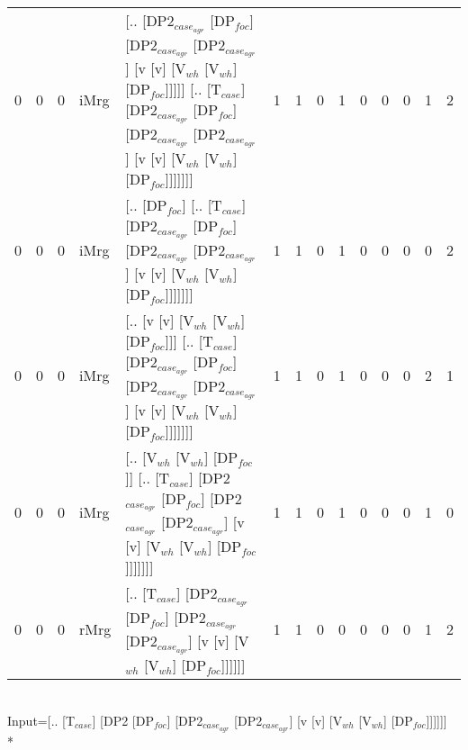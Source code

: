 \begin{tabularx}{\linewidth}{rrrlXrrrrrrrrr}
   0 &       0 &   0 & iMrg & [.. [DP2$_{case_{agr}}$ [DP$_{foc}$] [DP2$_{case_{agr}}$ [DP2$_{case_{agr}}$] [v [v] [V$_{wh}$ [V$_{wh}$] [DP$_{foc}$]]]]] [.. [T$_{case}$] [DP2$_{case_{agr}}$ [DP$_{foc}$] [DP2$_{case_{agr}}$ [DP2$_{case_{agr}}$] [v [v] [V$_{wh}$ [V$_{wh}$] [DP$_{foc}$]]]]]]] &             1 &             1 &                  0 &            1 &              0 &             0 &              0 &          1 &        2 \\
   0 &       0 &   0 & iMrg & [.. [DP$_{foc}$] [.. [T$_{case}$] [DP2$_{case_{agr}}$ [DP$_{foc}$] [DP2$_{case_{agr}}$ [DP2$_{case_{agr}}$] [v [v] [V$_{wh}$ [V$_{wh}$] [DP$_{foc}$]]]]]]]                                                                             &             1 &             1 &                  0 &            1 &              0 &             0 &              0 &          0 &        2 \\
   0 &       0 &   0 & iMrg & [.. [v [v] [V$_{wh}$ [V$_{wh}$] [DP$_{foc}$]]] [.. [T$_{case}$] [DP2$_{case_{agr}}$ [DP$_{foc}$] [DP2$_{case_{agr}}$ [DP2$_{case_{agr}}$] [v [v] [V$_{wh}$ [V$_{wh}$] [DP$_{foc}$]]]]]]]                                                       &             1 &             1 &                  0 &            1 &              0 &             0 &              0 &          2 &        1 \\
   0 &       0 &   0 & iMrg & [.. [V$_{wh}$ [V$_{wh}$] [DP$_{foc}$]] [.. [T$_{case}$] [DP2$_{case_{agr}}$ [DP$_{foc}$] [DP2$_{case_{agr}}$ [DP2$_{case_{agr}}$] [v [v] [V$_{wh}$ [V$_{wh}$] [DP$_{foc}$]]]]]]]                                                               &             1 &             1 &                  0 &            1 &              0 &             0 &              0 &          1 &        0 \\
   0 &       0 &   0 & rMrg & [.. [T$_{case}$] [DP2$_{case_{agr}}$ [DP$_{foc}$] [DP2$_{case_{agr}}$ [DP2$_{case_{agr}}$] [v [v] [V$_{wh}$ [V$_{wh}$] [DP$_{foc}$]]]]]]                                                                                           &             1 &             1 &                  0 &            0 &              0 &             0 &              0 &          1 &        2 \\
\hline
\end{tabularx}\endgroup\\
\begingroup\scriptsize Input=[.. [T$_{case}$] [DP2 [DP$_{foc}$] [DP2$_{case_{agr}}$ [DP2$_{case_{agr}}$] [v [v] [V$_{wh}$ [V$_{wh}$] [DP$_{foc}$]]]]]]\\*
